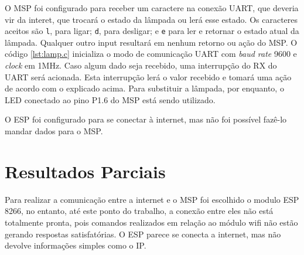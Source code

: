 \documentclass[12pt,journal,compsoc]{IEEEtran}
\begin{document}
O MSP foi configurado para receber um caractere na conexão UART, que deveria vir da interet, que trocará o estado da lâmpada ou lerá esse estado. Os caracteres aceitos são \texttt{l}, para ligar; \texttt{d}, para desligar; e \texttt{e} para ler e retornar o estado atual da lâmpada. Qualquer outro input resultará em nenhum retorno ou ação do MSP. O código \ref{lst:lamp.c} inicializa o modo de comunicação UART com \textit{baud rate} 9600 e \textit{clock} em 1MHz. Caso algum dado seja recebido, uma interrupção do RX do UART será acionada. Esta interrupção lerá o valor recebido e tomará uma ação de acordo com o explicado acima. Para substituir a lâmpada, por enquanto, o LED conectado ao pino P1.6 do MSP está sendo utilizado.



O ESP foi configurado para se conectar à internet, mas não foi possível fazê-lo mandar dados para o MSP.

\section{Resultados Parciais}

Para realizar a comunicação entre a internet e o MSP foi escolhido o modulo ESP 8266, no entanto, até este ponto do trabalho, a conexão entre eles não está totalmente pronta, pois comandos realizados em relação ao módulo wifi não estão gerando respostas satisfatórias. O ESP parece se conecta a internet, mas não devolve informações simples como o IP.




\end{document}
